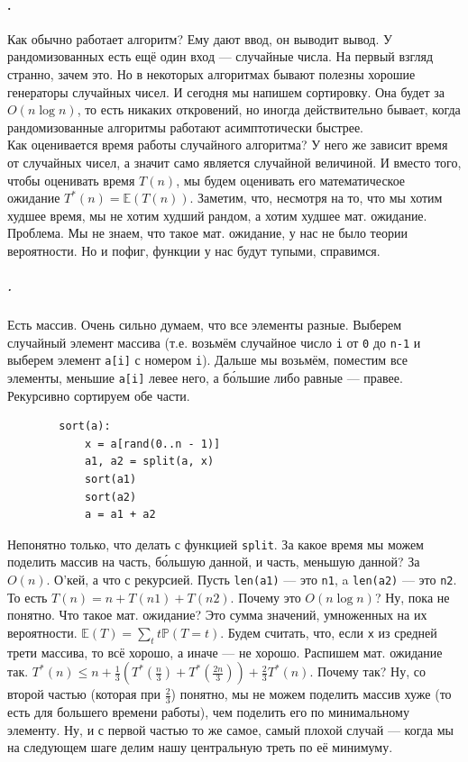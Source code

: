 \documentclass{article}
\newcommand{\pseudo}{PseudoLexer.py:PseudoLexer -x}
\newcommand{\pseudocode}[1]{\texttt{#1}}
\begin{document}
    \paragraph{.}
    Как обычно работает алгоритм? Ему дают ввод, он выводит вывод. У рандомизованных есть ещё один вход --- случайные числа. На первый взгляд странно, зачем это. Но в некоторых алгоритмах бывают полезны хорошие генераторы случайных чисел. И сегодня мы напишем сортировку. Она будет за $O(n\log n)$, то есть никаких откровений, но иногда действительно бывает, когда рандомизованные алгоритмы работают асимптотически быстрее.\\
    Как оценивается время работы случайного алгоритма? У него же зависит время от случайных чисел, а значит само является случайной величиной. И вместо того, чтобы оценивать время $T(n)$, мы будем оценивать его математическое ожидание $T^*(n)=\mathbb E(T(n))$. Заметим, что, несмотря на то, что мы хотим худшее время, мы не хотим худший рандом, а хотим худшее мат. ожидание. Проблема. Мы не знаем, что такое мат. ожидание, у нас не было теории вероятности. Но и пофиг, функции у нас будут тупыми, справимся.
    \subparagraph{.}
    Есть массив. Очень сильно думаем, что все элементы разные. Выберем случайный элемент массива (т.е. возьмём случайное число \pseudocode{i} от \pseudocode{0} до \pseudocode{n-1} и выберем элемент \pseudocode{a[i]} с номером \pseudocode{i}). Дальше мы возьмём, поместим все элементы, меньшие \pseudocode{a[i]} левее него, а б\'{о}льшие либо равные --- правее. Рекурсивно сортируем обе части.
    \begin{verbatim}
        sort(a):
            x = a[rand(0..n - 1)]
            a1, a2 = split(a, x)
            sort(a1)
            sort(a2)
            a = a1 + a2
    \end{verbatim}
    Непонятно только, что делать с функцией \pseudocode{split}. За какое время мы можем поделить массив на часть, б\'{о}льшую данной, и часть, меньшую данной? За $O(n)$. О'кей, а что с рекурсией. Пусть \pseudocode{len(a1)} --- это \pseudocode{n1}, a \pseudocode{len(a2)} --- это \pseudocode{n2}. То есть $T(n)=n+T(n1)+T(n2)$. Почему это $O(n\log n)$? Ну, пока не понятно. Что такое мат. ожидание? Это сумма значений, умноженных на их вероятности. $\mathbb E(T)=\sum_tt\mathbb P(T=t)$. Будем считать, что, если \pseudocode{x} из средней трети массива, то всё хорошо, а иначе --- не хорошо. Распишем мат. ожидание так. $T^*(n)\leqslant n+\frac13\left(T^*(\frac n3)+T^*(\frac{2n}3)\right)+\frac23T^*(n)$. Почему так? Ну, со второй частью (которая при $\frac23$) понятно, мы не можем поделить массив хуже (то есть для большего времени работы), чем поделить его по минимальному элементу. Ну, и с первой частью то же самое, самый плохой случай --- когда мы на следующем шаге делим нашу центральную треть по её минимуму.\\
\end{document}
